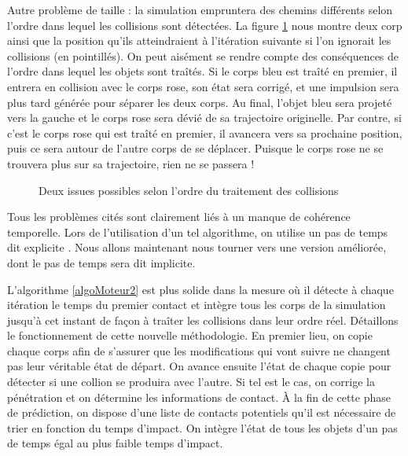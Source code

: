 Autre problème de taille : la simulation empruntera des chemins
différents selon l'ordre dans lequel les collisions sont détectées. La
figure \ref{issues} nous montre deux corp ainsi que la position qu'ils
atteindraient à l'itération suivante si l'on ignorait les collisions
(en pointillés). On peut aisément se rendre compte des conséquences de
l'ordre dans lequel les objets sont traîtés. Si le corps bleu est
traîté en premier, il entrera en collision avec le corps rose, son
état sera corrigé, et une impulsion sera plus tard générée pour
séparer les deux corps. Au final, l'objet bleu sera projeté vers la
gauche et le corps rose sera dévié de sa trajectoire originelle. Par
contre, si c'est le corps rose qui est traîté en premier, il avancera
vers sa prochaine position, puis ce sera autour de l'autre corps de se
déplacer. Puisque le corps rose ne se trouvera plus sur sa
trajectoire, rien ne se passera !

\begin{figure}
  \centering
  \subfloat{  }
  \caption{Deux issues possibles selon l'ordre du traitement des collisions}
  \label{issues}
\end{figure}

Tous les problèmes cités sont clairement liés à un manque de cohérence
temporelle. Lors de l'utilisation d'un tel algorithme, on utilise un
pas de temps dit explicite \cite{garstenauer}. Nous allons maintenant
nous tourner vers une version améliorée, dont le pas de temps sera dit
implicite.

L'algorithme \ref{algoMoteur2} est plus solide dans la mesure o\`u il
détecte à chaque itération le temps du premier contact et intègre tous
les corps de la simulation jusqu'à cet instant de façon à traîter les
collisions dans leur ordre réel. Détaillons le fonctionnement de cette
nouvelle méthodologie. En premier lieu, on copie chaque corps afin de
s'assurer que les modifications qui vont suivre ne changent pas leur
véritable état de départ. On avance ensuite l'état de chaque copie
pour détecter si une collion se produira avec l'autre. Si tel est le
cas, on corrige la pénétration et on détermine les informations de
contact. \`A la fin de cette phase de prédiction, on dispose d'une
liste de contacts potentiels qu'il est nécessaire de trier en fonction
du temps d'impact. On intègre l'état de tous les objets d'un pas de
temps égal au plus faible temps d'impact.

